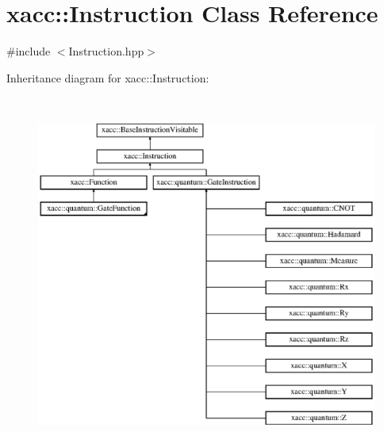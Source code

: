\hypertarget{a00161}{}\section{xacc\+:\+:Instruction Class Reference}
\label{a00161}


{\ttfamily \#include $<$Instruction.\+hpp$>$}

Inheritance diagram for xacc\+:\+:Instruction\+:\begin{figure}[H]
\begin{center}
\leavevmode
\includegraphics[height=11.851852cm]{a00161}
\end{center}
\end{figure}
